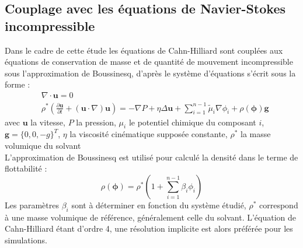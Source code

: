 \subsection{Couplage avec les équations de Navier-Stokes incompressible}
Dans le cadre de cette étude les équations de Cahn-Hilliard sont couplées aux équations de conservation de masse et de quantité de mouvement incompressible sous l'approximation de Boussinesq, d'après \cite{kim_phase-field_2012} le système d'équations s'écrit sous la forme :
\begin{subequations}
\begin{align}
&\nabla \cdot \mathbf{u} = 0\\
&\rho^* \left (\frac{\partial \mathbf{u}}{\partial t} + (\mathbf{u} \cdot {\nabla})\mathbf{u}\right) = -{\nabla} P +\eta \Delta \mathbf{u}+\sum_{i=1}^{n-1} \tilde{\mu}_i{\nabla} \phi_i + \rho(\bm{\phi}) \mathbf{g}
\end{align}
\end{subequations}
avec $\mathbf{u}$ la vitesse, $P$ la pression, $\mu_i$ le potentiel chimique du composant $i$, $\mathbf{g} = \{ 0,0,-g\}^T $, $\eta$ la viscosité cinématique supposée constante, $\rho^*$ la masse volumique du solvant \\
L'approximation de Boussinesq est utilisé pour calculé la densité dans le terme de flottabilité :
\begin{equation}
	\rho(\bm{\phi}) = \rho^*\left(1+\sum_{i=1}^{n-1}\beta_i \phi_i\right)
\end{equation}
Les paramètres $\beta_i$ sont à déterminer en fonction du système étudié, $\rho^*$ correspond à une masse volumique de référence, généralement celle du solvant. L'équation de Cahn-Hilliard étant d'ordre 4, une résolution implicite est alors préférée pour les simulations.
